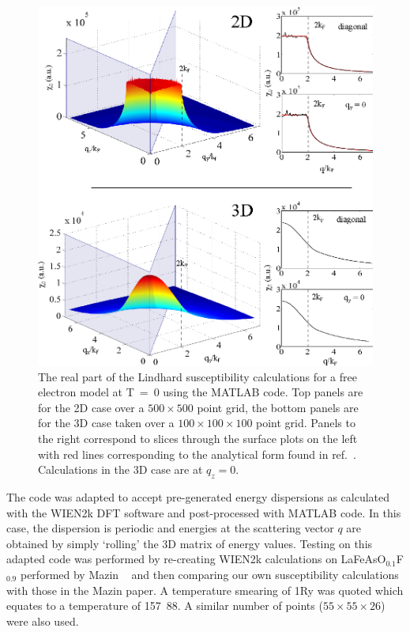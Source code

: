 \begin{figure}[htbp]
    \begin{center}
        \includegraphics[scale=0.9]{Chapter-ExperimentalTechnique/Figures/Susceptibility/FreeElectron/FreeElectron}
        \caption{The real part of the Lindhard susceptibility calculations for a free electron model at \unit{T=0}{\kelvin} using the MATLAB  code. Top panels are for the 2D case over a $500\times500$ point grid, the bottom panels are for the 3D case taken over a $100\times100\times100$ point grid. Panels to the right correspond to slices through the surface plots on the left with red lines corresponding to the analytical form found in ref.~\cite{Blundell2001}. Calculations in the 3D case are at $q_z=0$.}
        \label{Fig:Exp:FreeElectronSusceptibility}
    \end{center}
\end{figure}


The code was adapted to accept pre-generated energy dispersions as calculated with the WIEN2k DFT software and post-processed with MATLAB code. In this case, the dispersion is periodic and energies at the scattering vector $q$ are obtained by simply `rolling' the 3D matrix of energy values. Testing on this adapted code was performed by re-creating WIEN2k calculations on LaFeAsO$_{0.1}$F$_{0.9}$ performed by Mazin \etal~\cite{Mazin2008} and then comparing our own susceptibility calculations with those in the Mazin paper. A temperature smearing of \unit{1}{\milli\textrm{Ry}} was quoted which equates to a temperature of \unit{157.88}{\kelvin}. A similar number of points ($55\times55\times26$) were also used.

